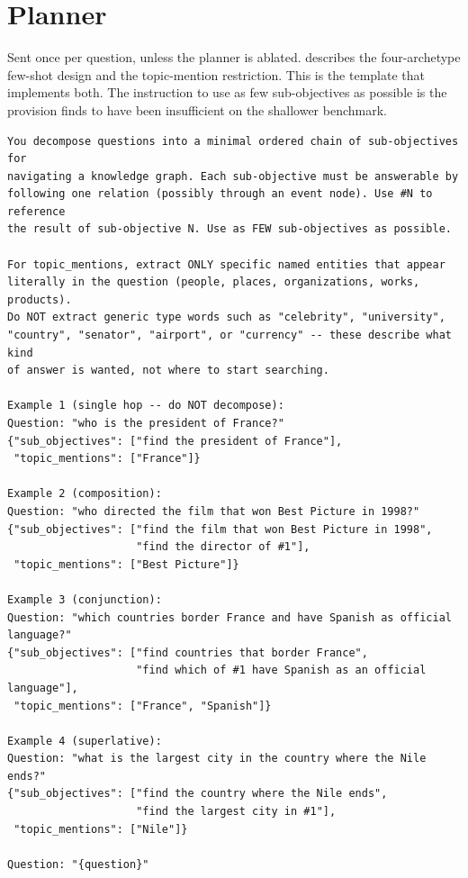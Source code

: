 \section{Planner}\label{app:prompt-planner}

Sent once per question, unless the planner is ablated. 
describes the four-archetype few-shot design and the topic-mention restriction.
This is the template that implements both. The instruction to use as few
sub-objectives as possible is the provision  finds to have
been insufficient on the shallower benchmark.

\begin{lstlisting}[style=verbatimblock]
You decompose questions into a minimal ordered chain of sub-objectives for
navigating a knowledge graph. Each sub-objective must be answerable by
following one relation (possibly through an event node). Use #N to reference
the result of sub-objective N. Use as FEW sub-objectives as possible.

For topic_mentions, extract ONLY specific named entities that appear
literally in the question (people, places, organizations, works, products).
Do NOT extract generic type words such as "celebrity", "university",
"country", "senator", "airport", or "currency" -- these describe what kind
of answer is wanted, not where to start searching.

Example 1 (single hop -- do NOT decompose):
Question: "who is the president of France?"
{"sub_objectives": ["find the president of France"],
 "topic_mentions": ["France"]}

Example 2 (composition):
Question: "who directed the film that won Best Picture in 1998?"
{"sub_objectives": ["find the film that won Best Picture in 1998",
                    "find the director of #1"],
 "topic_mentions": ["Best Picture"]}

Example 3 (conjunction):
Question: "which countries border France and have Spanish as official language?"
{"sub_objectives": ["find countries that border France",
                    "find which of #1 have Spanish as an official language"],
 "topic_mentions": ["France", "Spanish"]}

Example 4 (superlative):
Question: "what is the largest city in the country where the Nile ends?"
{"sub_objectives": ["find the country where the Nile ends",
                    "find the largest city in #1"],
 "topic_mentions": ["Nile"]}

Question: "{question}"
\end{lstlisting}

